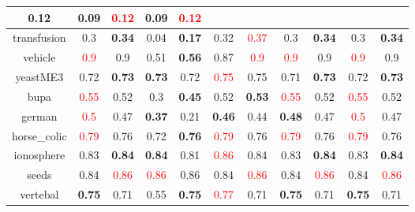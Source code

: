 \documentclass{article}%
\begin{document}
\begin{tabular}{c|cccccccccc}
{0.12
}&0.09&\textcolor{red}{ 
0.12
}&0.09&\textcolor{red}{ 
0.12
}\\%
\hline%
transfusion&0.3&\textbf{0.34}&0.04&\textbf{0.17}&0.32&\textcolor{red}{ 
0.37
}&0.3&\textbf{0.34}&0.3&\textbf{0.34}\\%
\hline%
vehicle&\textcolor{red}{ 
0.9
}&0.9&0.51&\textbf{0.56}&0.87&\textcolor{red}{ 
0.9
}&\textcolor{red}{ 
0.9
}&0.9&\textcolor{red}{ 
0.9
}&0.9\\%
\hline%
yeastME3&0.72&\textbf{0.73}&\textbf{0.73}&0.72&\textcolor{red}{ 
0.75
}&0.75&0.71&\textbf{0.73}&0.72&\textbf{0.73}\\%
\hline%
bupa&\textcolor{red}{ 
0.55
}&0.52&0.3&\textbf{0.45}&0.52&\textbf{0.53}&\textcolor{red}{ 
0.55
}&0.52&\textcolor{red}{ 
0.55
}&0.52\\%
\hline%
german&\textcolor{red}{ 
0.5
}&0.47&\textbf{0.37}&0.21&\textbf{0.46}&0.44&\textbf{0.48}&0.47&\textcolor{red}{ 
0.5
}&0.47\\%
\hline%
horse\_colic&\textcolor{red}{ 
0.79
}&0.76&0.72&\textbf{0.76}&\textcolor{red}{ 
0.79
}&0.76&\textcolor{red}{ 
0.79
}&0.76&\textcolor{red}{ 
0.79
}&0.76\\%
\hline%
ionosphere&0.83&\textbf{0.84}&\textbf{0.84}&0.81&\textcolor{red}{ 
0.86
}&0.84&0.83&\textbf{0.84}&0.83&\textbf{0.84}\\%
\hline%
seeds&0.84&\textcolor{red}{ 
0.86
}&\textcolor{red}{ 
0.86
}&0.86&0.84&\textcolor{red}{ 
0.86
}&0.84&\textcolor{red}{ 
0.86
}&0.84&\textcolor{red}{ 
0.86
}\\%
\hline%
vertebal&\textbf{0.75}&0.71&0.55&\textbf{0.75}&\textcolor{red}{ 
0.77
}&0.71&\textbf{0.75}&0.71&\textbf{0.75}&0.71\\%
\hline%
\end{tabular}

%
\end{document}
